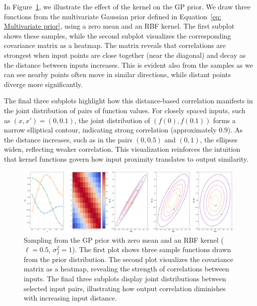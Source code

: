 \documentclass[11pt]{article}
\begin{document}
\vspace{1em}
\noindent
In Figure~\ref{fig: samples_from_GP_prior}, we illustrate the effect of the kernel on the GP prior.
We draw three functions from the multivariate Gaussian prior defined in Equation~\ref{eq: Multivariate prior}, using a zero mean and an RBF kernel.
The first subplot shows these samples, while the second subplot visualizes the corresponding covariance matrix as a heatmap.
The matrix reveals that correlations are strongest when input points are close together (near the diagonal) and decay as the distance between inputs increases.
This is evident also from the samples as we can see nearby points often move in similar directions, while distant points diverge more significantly.

\vspace{1em}
\noindent
The final three subplots highlight how this distance-based correlation manifests in the joint distribution of pairs of function values.
For closely spaced inputs, such as \( (x, x') = (0, 0.1) \), the joint distribution of \( (f(0), f(0.1)) \) forms a narrow elliptical contour,
indicating strong correlation (approximately 0.9). As the distance increases, such as in the pairs \( (0, 0.5) \) and \( (0, 1) \), the ellipses widen, reflecting weaker correlation. This visualization reinforces the intuition that kernel functions govern how input proximity translates to output similarity.

\begin{figure}[H]
    \centering
        \includegraphics[width=1\textwidth]{LatexPlots/1dplots/Kernel_background.png}
        \caption{Sampling from the GP prior with zero mean and an RBF kernel ($\ell = 0.5$, $\sigma_f^2 = 1$). 
        The first plot shows three sample functions drawn from the prior distribution. 
        The second plot visualizes the covariance matrix as a heatmap, revealing the strength of correlations between inputs.
        The final three subplots display joint distributions between selected input pairs, illustrating how output correlation diminishes with increasing input distance.}
    \label{fig: samples_from_GP_prior}
\end{figure}
\end{document}
